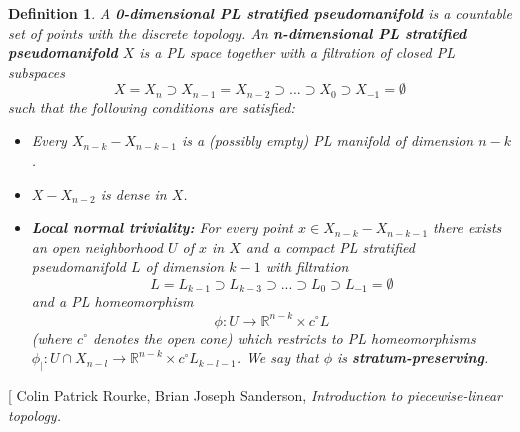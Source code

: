 \documentclass[11pt]{book}
\newtheorem{definition}{Definition}
\begin{document}
\begin{definition}
A \textbf{0-dimensional PL stratified pseudomanifold} is a countable set of points with the discrete topology. An \textbf{n-dimensional PL stratified pseudomanifold} $X$ is a PL space together with a filtration of closed PL subspaces
\begin{equation*}
X=X_n \supset X_{n-1} = X_{n-2} \supset ... \supset X_0 \supset X_{-1} = \emptyset
\end{equation*}
such that the following conditions are satisfied:
\begin{itemize}
\item Every $X_{n-k} - X_{n-k-1}$ is a (possibly empty) PL manifold of dimension $n-k$.
\item $X-X_{n-2}$ is dense in $X$.
\item \textbf{Local normal triviality:} For every point $x \in X_{n-k} - X_{n-k-1}$ there exists an open neighborhood $U$ of $x$  in $X$ and a compact PL stratified pseudomanifold $L$ of dimension $k-1$ with filtration
\begin{equation*}
L = L_{k-1} \supset L_{k-3} \supset ... \supset L_0 \supset L_{-1}= \emptyset
\end{equation*}
and a PL homeomorphism
\begin{equation*}
\phi : U \to \mathbb{R}^{n-k} \times c^{\circ} L
\end{equation*}
(where $c^{\circ}$ denotes the open cone) which restricts to PL homeomorphisms $\phi_| : U \cap X_{n-l} \to \mathbb{R}^{n-k} \times c^{\circ} L_{k-l-1}$. We say that $\phi$ is \textbf{stratum-preserving}.
\end{itemize}
\end{definition}


\begin{thebibliography}[
Colin Patrick Rourke, Brian Joseph Sanderson, \textit{Introduction to piecewise-linear topology.}
\end{thebibliography}
\end{document}
